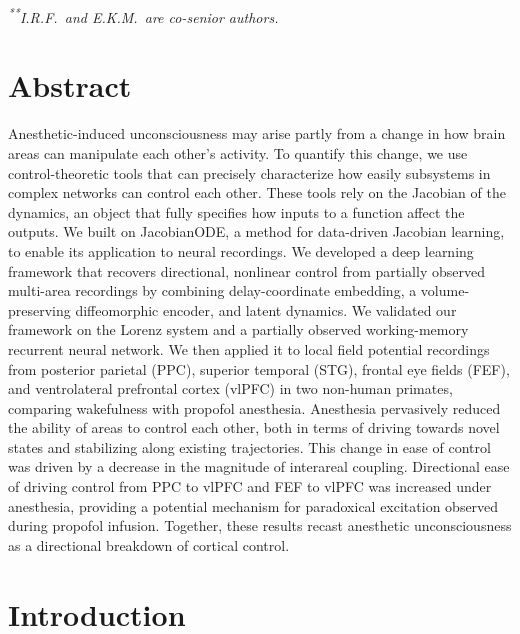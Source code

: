 \noindent \textit{\textsuperscript{**}I.R.F.\ and E.K.M.\ are co-senior authors.}

\vspace{1em}

\section*{Abstract}\label{sec:interareal-control-abstract}

Anesthetic-induced unconsciousness may arise partly from a change in how brain areas can manipulate each other's activity. To quantify this change, we use control-theoretic tools that can precisely characterize how easily subsystems in complex networks can control each other. These tools rely on the Jacobian of the dynamics, an object that fully specifies how inputs to a function affect the outputs. We built on JacobianODE, a method for data-driven Jacobian learning, to enable its application to neural recordings. We developed a deep learning framework that recovers directional, nonlinear control from partially observed multi-area recordings by combining delay-coordinate embedding, a volume-preserving diffeomorphic encoder, and latent dynamics. We validated our framework on the Lorenz system and a partially observed working-memory recurrent neural network. We then applied it to local field potential recordings from posterior parietal (PPC), superior temporal (STG), frontal eye fields (FEF), and ventrolateral prefrontal cortex (vlPFC) in two non-human primates, comparing wakefulness with propofol anesthesia. Anesthesia pervasively reduced the ability of areas to control each other, both in terms of driving towards novel states and stabilizing along existing trajectories. This change in ease of control was driven by a decrease in the magnitude of interareal coupling. Directional ease of driving control from PPC to vlPFC and FEF to vlPFC was increased under anesthesia, providing a potential mechanism for paradoxical excitation observed during propofol infusion. Together, these results recast anesthetic unconsciousness as a directional breakdown of cortical control.

\section{Introduction}
\label{sec:interareal-control-introduction}

